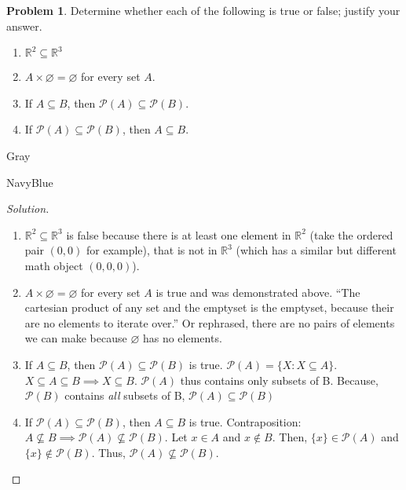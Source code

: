\documentclass[12pt]{amsart}
\newcounter{problem_number}[section]
\theoremstyle{named}
\newenvironment{soln}
{\begin{color}{Gray}\begin{framed}\begin{color}{NavyBlue}\begin{proof}[Solution]
\doublespacing}
{\end{proof}\end{color}\end{framed}\end{color}}
\theoremstyle{definition}
\newtheorem{problem}{Problem}
\newcommand{\R}{\mathbb R}
\begin{document}
\begin{problem}
	Determine whether each of the following is true or false; justify your answer.
	\begin{enumerate}
		\item $\R^2\subseteq\R^3$
		\item $A\times\varnothing = \varnothing$ for every set $A$.
		\item If $A\subseteq B$, then $\mathscr P(A)\subseteq\mathscr P(B)$.	
		\item If $\mathscr P(A)\subseteq\mathscr P(B)$, then $A\subseteq B$. 
	\end{enumerate}
	
\end{problem}

\begin{soln}
    \phantom{ }
    \begin{enumerate}
        \item $\R^2\subseteq\R^3$ is false because there is at least one element
        in $\R^2$ (take the ordered pair $(0,0)$ for example), that is not in
        $\R^3$ (which has a similar but different math object $(0,0,0)$). 

        \item $A\times\varnothing = \varnothing$ for every set $A$ is true and
        was demonstrated above. ``The cartesian product of any set and the
        emptyset is the emptyset, because their are no elements to iterate
        over.'' Or rephrased, there are no pairs of elements we can make because
        $\varnothing$ has no elements.

        \item If $A\subseteq B$, then $\mathscr P(A)\subseteq\mathscr P(B)$ is
        true. $\mathscr P(A) = \{X : X \subseteq A\}$. $X \subseteq A \subseteq
        B \implies X \subseteq B$. $\mathscr P(A)$ thus contains only subsets of
        B. Because, $\mathscr P(B)$ contains \textit{all} subsets of B,
        $\mathscr P(A)\subseteq \mathscr P(B)$

        \item If $\mathscr P(A)\subseteq\mathscr P(B)$, then $A\subseteq B$ is true.
        Contraposition: $A \nsubseteq B \implies \mathscr P(A) \nsubseteq \mathscr P(B)$.
        Let $x \in A$ and $x \notin B$. Then, $\{x\} \in \mathscr P(A)$ and $\{x\} \notin
        \mathscr P(B)$. Thus, $\mathscr P(A) \nsubseteq \mathscr P(B)$. 
	\end{enumerate}
\end{soln}
\end{document}
